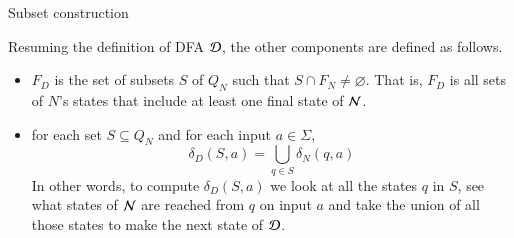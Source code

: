 %
\begin{frame}{Subset construction}

Resuming the definition of DFA \({\cal D}\), the other components are
defined as follows.

\begin{itemize}

  \item \(F_D\) is the set of subsets \(S\) of \(Q_N\) such that \(S
    \cap F_N \neq \varnothing\). That is, \(F_D\) is all sets of
    \(N\)'s states that include at least one final state of \({\cal
      N}\).

  \item for each set \(S \subseteq Q_N\) and for each input \(a \in
  \Sigma\),
  \[
    \delta_D(S, a) = \bigcup_{q \in S}{\delta_N (q, a)}
  \]
  In other words, to compute \(\delta_D (S, a)\) we look at all the
  states \(q\) in \(S\), see what states of \({\cal N}\) are reached
  from \(q\) on input \(a\) and take the union of all those states to
  make the next state of \({\cal D}\).

\end{itemize}

\end{frame}

